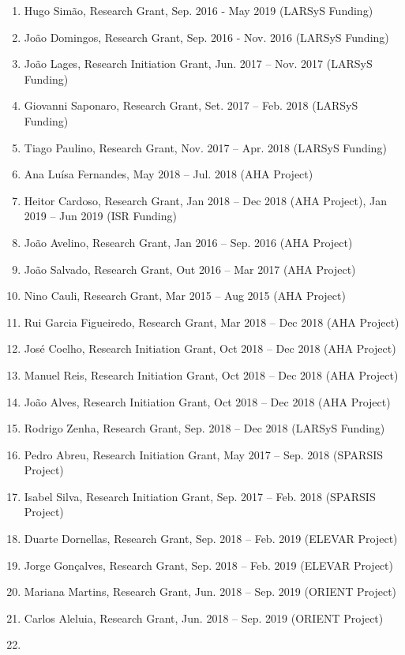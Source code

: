 \documentclass[
]{article}
\begin{document}
\begin{enumerate}
  Project)
\item
  Hugo Simão, Research Grant, Sep. 2016 - May 2019 (LARSyS Funding)
\item
  João Domingos, Research Grant, Sep. 2016 - Nov. 2016 (LARSyS Funding)
\item
  João Lages, Research Initiation Grant, Jun. 2017 -- Nov. 2017 (LARSyS
  Funding)
\item
  Giovanni Saponaro, Research Grant, Set. 2017 -- Feb. 2018 (LARSyS
  Funding)
\item
  Tiago Paulino, Research Grant, Nov. 2017 -- Apr. 2018 (LARSyS Funding)
\item
  Ana Luísa Fernandes, May 2018 -- Jul. 2018 (AHA Project)
\item
  Heitor Cardoso, Research Grant, Jan 2018 -- Dec 2018 (AHA Project),
  Jan 2019 -- Jun 2019 (ISR Funding)
\item
  João Avelino, Research Grant, Jan 2016 -- Sep. 2016 (AHA Project)
\item
  João Salvado, Research Grant, Out 2016 -- Mar 2017 (AHA Project)
\item
  Nino Cauli, Research Grant, Mar 2015 -- Aug 2015 (AHA Project)
\item
  Rui Garcia Figueiredo, Research Grant, Mar 2018 -- Dec 2018 (AHA
  Project)
\item
  José Coelho, Research Initiation Grant, Oct 2018 -- Dec 2018 (AHA
  Project)
\item
  Manuel Reis, Research Initiation Grant, Oct 2018 -- Dec 2018 (AHA
  Project)
\item
  João Alves, Research Initiation Grant, Oct 2018 -- Dec 2018 (AHA
  Project)
\item
  Rodrigo Zenha, Research Grant, Sep. 2018 -- Dec 2018 (LARSyS Funding)
\item
  Pedro Abreu, Research Initiation Grant, May 2017 -- Sep. 2018 (SPARSIS
  Project)
\item
  Isabel Silva, Research Initiation Grant, Sep. 2017 -- Feb. 2018
  (SPARSIS Project)
\item
  Duarte Dornellas, Research Grant, Sep. 2018 -- Feb. 2019 (ELEVAR
  Project)
\item
  Jorge Gonçalves, Research Grant, Sep. 2018 -- Feb. 2019 (ELEVAR
  Project)
\item
  Mariana Martins, Research Grant, Jun. 2018 -- Sep. 2019 (ORIENT
  Project)
\item
  Carlos Aleluia, Research Grant, Jun. 2018 -- Sep. 2019 (ORIENT
  Project)
\item

\end{enumerate}
\end{document}
